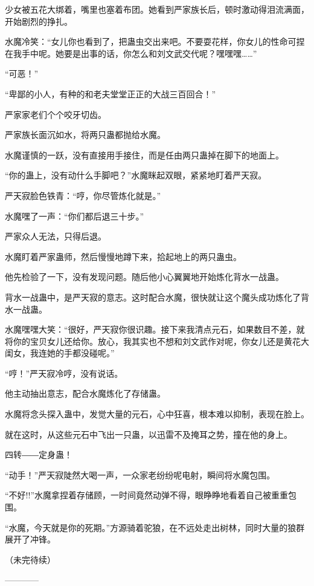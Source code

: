 \begin{this_body}
少女被五花大绑着，嘴里也塞着布团。她看到严家族长后，顿时激动得泪流满面，开始剧烈的挣扎。

水魔冷笑：“女儿你也看到了，把蛊虫交出来吧。不要耍花样，你女儿的性命可捏在我手中呢。她要是出事的话，你怎么和刘文武交代呢？嘿嘿嘿……”

“可恶！”

“卑鄙的小人，有种的和老夫堂堂正正的大战三百回合！”

严家家老们个个咬牙切齿。

严家族长面沉如水，将两只蛊都抛给水魔。

水魔谨慎的一跃，没有直接用手接住，而是任由两只蛊掉在脚下的地面上。

“你的蛊上，没有动什么手脚吧？”水魔眯起双眼，紧紧地盯着严天寂。

严天寂脸色铁青：“哼，你尽管炼化就是。”

水魔嘿了一声：“你们都后退三十步。”

严家众人无法，只得后退。

水魔盯着严家蛊师，然后慢慢地蹲下来，拾起地上的两只蛊虫。

他先检验了一下，没有发现问题。随后他小心翼翼地开始炼化背水一战蛊。

背水一战蛊中，是严天寂的意志。这时配合水魔，很快就让这个魔头成功炼化了背水一战蛊。

水魔嘿嘿大笑：“很好，严天寂你很识趣。接下来我清点元石，如果数目不差，就将你的宝贝女儿还给你。放心，我其实也不想和刘文武作对呢，你女儿还是黄花大闺女，我连她的手都没碰呢。”

“哼！”严天寂冷哼，没有说话。

他主动抽出意志，配合水魔炼化了存储蛊。

水魔将念头探入蛊中，发觉大量的元石，心中狂喜，根本难以抑制，表现在脸上。

就在这时，从这些元石中飞出一只蛊，以迅雷不及掩耳之势，撞在他的身上。

四转――定身蛊！

“动手！”严天寂陡然大喝一声，一众家老纷纷呢电射，瞬间将水魔包围。

“不好!!”水魔拿捏着存储顾，一时间竟然动弹不得，眼睁睁地看着自己被重重包围。

“水魔，今天就是你的死期。”方源骑着驼狼，在不远处走出树林，同时大量的狼群展开了冲锋。

（未完待续）

------------

\end{this_body}

